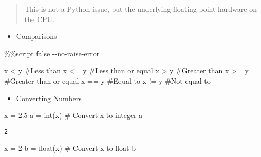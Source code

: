 \documentclass[
  letterpaper,
  DIV=11,
  numbers=noendperiod]{scrreprt}
\newenvironment{Shaded}{\begin{snugshade}}{\end{snugshade}}
\newcommand{\BuiltInTok}[1]{\textcolor[rgb]{0.00,0.46,0.62}{#1}}
\newcommand{\BuiltInTok}[1]{\textcolor[rgb]{0.00,0.48,0.65}{#1}}
\newcommand{\CommentTok}[1]{\textcolor[rgb]{0.37,0.37,0.37}{#1}}
\newcommand{\ControlFlowTok}[1]{\textcolor[rgb]{0.00,0.46,0.62}{#1}}
\newcommand{\ControlFlowTok}[1]{\textcolor[rgb]{0.00,0.48,0.65}{#1}}
\newcommand{\DecValTok}[1]{\textcolor[rgb]{0.68,0.00,0.00}{#1}}
\newcommand{\FloatTok}[1]{\textcolor[rgb]{0.68,0.00,0.00}{#1}}
\newcommand{\NormalTok}[1]{\textcolor[rgb]{0.00,0.46,0.62}{#1}}
\newcommand{\OperatorTok}[1]{\textcolor[rgb]{0.37,0.37,0.37}{#1}}
\newcommand{\FloatTok}[1]{\textcolor[rgb]{0.68,0.00,0.00}{#1}}
\newcommand{\NormalTok}[1]{\textcolor[rgb]{0.00,0.48,0.65}{#1}}
\newcommand{\OperatorTok}[1]{\textcolor[rgb]{0.37,0.37,0.37}{#1}}
\providecommand{\tightlist}{%
  \setlength{\itemsep}{0pt}\setlength{\parskip}{0pt}}
\begin{document}
\begin{Shaded}
\begin{Highlighting}[]
\begin{quote}
This is not a Python issue, but the underlying floating point hardware
on the CPU.
\end{quote}

\begin{itemize}
\tightlist
\item
  Comparisons
\end{itemize}

\begin{Shaded}
\begin{Highlighting}[]
\OperatorTok{\%\%}\NormalTok{script false }\OperatorTok{{-}{-}}\NormalTok{no}\OperatorTok{{-}}\ControlFlowTok{raise}\OperatorTok{{-}}\NormalTok{error}

\NormalTok{x }\OperatorTok{\textless{}}\NormalTok{ y      }\CommentTok{\#Less than}
\NormalTok{x }\OperatorTok{\textless{}=}\NormalTok{ y     }\CommentTok{\#Less than or equal}
\NormalTok{x }\OperatorTok{\textgreater{}}\NormalTok{ y      }\CommentTok{\#Greater than}
\NormalTok{x }\OperatorTok{\textgreater{}=}\NormalTok{ y     }\CommentTok{\#Greater than or equal}
\NormalTok{x }\OperatorTok{==}\NormalTok{ y     }\CommentTok{\#Equal to}
\NormalTok{x }\OperatorTok{!=}\NormalTok{ y     }\CommentTok{\#Not equal to}
\end{Highlighting}
\end{Shaded}

\begin{itemize}
\tightlist
\item
  Converting Numbers
\end{itemize}

\begin{Shaded}
\begin{Highlighting}[]
\NormalTok{x }\OperatorTok{=} \FloatTok{2.5}
\NormalTok{a }\OperatorTok{=} \BuiltInTok{int}\NormalTok{(x)    }\CommentTok{\# Convert x to integer}
\NormalTok{a}
\end{Highlighting}
\end{Shaded}

\begin{verbatim}
2
\end{verbatim}

\begin{Shaded}
\begin{Highlighting}[]
\NormalTok{x }\OperatorTok{=} \DecValTok{2}
\NormalTok{b }\OperatorTok{=} \BuiltInTok{float}\NormalTok{(x)  }\CommentTok{\# Convert x to float}
\NormalTok{b}
\end{Highlighting}
\end{Shaded}


\end{Highlighting}
\end{Shaded}
\end{document}
